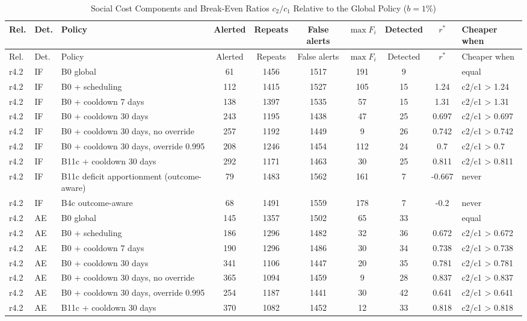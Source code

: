 \documentclass[10pt,onecolumn,letterpaper]{article}
\begin{document}
\begin{longtable}{llp{4.6cm}ccccccl}
\caption{Social Cost Components and Break-Even Ratios $c_2/c_1$ Relative to the Global Policy ($b=1\%$)\label{tab:e-l5}}\\
\toprule
Rel. & Det. & Policy & Alerted & Repeats & False alerts & $\max F_i$ & Detected & $r^\ast$ & Cheaper when \\
\midrule
\endfirsthead
\toprule
Rel. & Det. & Policy & Alerted & Repeats & False alerts & $\max F_i$ & Detected & $r^\ast$ & Cheaper when \\
\midrule
\endhead
r4.2 & IF & B0 global & 61 & 1456 & 1517 & 191 & 9 &  & equal \\
r4.2 & IF & B0 + scheduling & 112 & 1415 & 1527 & 105 & 15 & 1.24 & c2/c1 > 1.24 \\
r4.2 & IF & B0 + cooldown 7 days & 138 & 1397 & 1535 & 57 & 15 & 1.31 & c2/c1 > 1.31 \\
r4.2 & IF & B0 + cooldown 30 days & 243 & 1195 & 1438 & 47 & 25 & 0.697 & c2/c1 > 0.697 \\
r4.2 & IF & B0 + cooldown 30 days, no override & 257 & 1192 & 1449 & 9 & 26 & 0.742 & c2/c1 > 0.742 \\
r4.2 & IF & B0 + cooldown 30 days, override 0.995 & 208 & 1246 & 1454 & 112 & 24 & 0.7 & c2/c1 > 0.7 \\
r4.2 & IF & B11c + cooldown 30 days & 292 & 1171 & 1463 & 30 & 25 & 0.811 & c2/c1 > 0.811 \\
r4.2 & IF & B11c deficit apportionment (outcome-aware) & 79 & 1483 & 1562 & 161 & 7 & -0.667 & never \\
r4.2 & IF & B4c outcome-aware & 68 & 1491 & 1559 & 178 & 7 & -0.2 & never \\
r4.2 & AE & B0 global & 145 & 1357 & 1502 & 65 & 33 &  & equal \\
r4.2 & AE & B0 + scheduling & 186 & 1296 & 1482 & 32 & 36 & 0.672 & c2/c1 > 0.672 \\
r4.2 & AE & B0 + cooldown 7 days & 190 & 1296 & 1486 & 30 & 34 & 0.738 & c2/c1 > 0.738 \\
r4.2 & AE & B0 + cooldown 30 days & 341 & 1106 & 1447 & 20 & 35 & 0.781 & c2/c1 > 0.781 \\
r4.2 & AE & B0 + cooldown 30 days, no override & 365 & 1094 & 1459 & 9 & 28 & 0.837 & c2/c1 > 0.837 \\
r4.2 & AE & B0 + cooldown 30 days, override 0.995 & 254 & 1187 & 1441 & 30 & 42 & 0.641 & c2/c1 > 0.641 \\
r4.2 & AE & B11c + cooldown 30 days & 370 & 1082 & 1452 & 12 & 33 & 0.818 & c2/c1 > 0.818 \\

\end{longtable}
\end{document}
